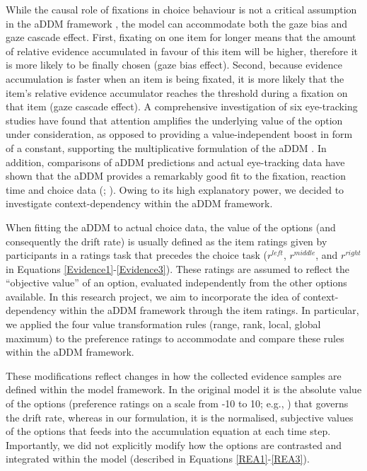 \documentclass[11pt,a4paper]{article}
\begin{document}
While the causal role of fixations in choice behaviour is not a critical assumption in the aDDM framework \cite{Krajbich2019}, the model can accommodate both the gaze bias and gaze cascade effect. First, fixating on one item for longer means that the amount of relative evidence accumulated in favour of this item will be higher, therefore it is more likely to be finally chosen (gaze bias effect). Second, because evidence accumulation is faster when an item is being fixated, it is more likely that the item's relative evidence accumulator reaches the threshold during a fixation on that item (gaze cascade effect). A comprehensive investigation of six eye-tracking studies have found that attention amplifies the underlying value of the option under consideration, as opposed to providing a value-independent boost in form of a constant, supporting the multiplicative formulation of the aDDM \cite{Smith2019}. In addition, comparisons of aDDM predictions and actual eye-tracking data have shown that the aDDM provides a remarkably good fit to the fixation, reaction time and choice data (; ). Owing to its high explanatory power, we decided to investigate context-dependency within the aDDM framework. 

When fitting the aDDM to actual choice data, the value of the options (and consequently the drift rate) is usually defined as the item ratings given by participants in a ratings task that precedes the choice task ($r^{left}$, $r^{middle}$, and $r^{right}$ in Equations \ref{Evidence1}-\ref{Evidence3}). These ratings are assumed to reflect the “objective value” of an option, evaluated independently from the other options available. In this research project, we aim to incorporate the idea of context-dependency within the aDDM framework through the item ratings. In particular, we applied the four value transformation rules (range, rank, local, global maximum) to the preference ratings to accommodate and compare these rules within the aDDM framework.


These modifications reflect changes in how the collected evidence samples are defined within the model framework. In the original model it is the absolute value of the options (preference ratings on a scale from -10 to 10; e.g., ) that governs the drift rate, whereas in our formulation, it is the normalised, subjective values of the options that feeds into the accumulation equation at each time step. Importantly, we did not explicitly modify how the options are contrasted and integrated within the model (described in Equations \ref{REA1}-\ref{REA3}).
\end{document}

